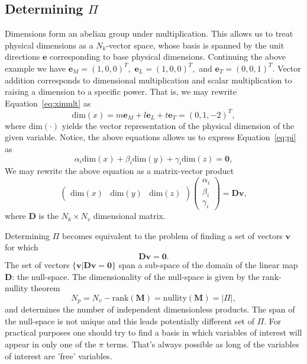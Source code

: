 \documentclass[11pt]{article}
\begin{document}
\subsection{Determining $\Pi$}
Dimensions form an abelian group under multiplication. This allows us to treat physical dimensions as a $N_k$-vector space, whose basis is spanned by the unit directions $\mathbf{e}$ corresponding to base physical dimensions. Continuing the above example we have $\mathbf{e}_M=(1,0,0)^T,$ $\mathbf{e}_L=(1,0,0)^T,$ and $\mathbf{e}_T=(0,0,1)^T$. Vector addition corresponds to dimensional multiplication and scalar multiplication to raising a dimension to a specific power. That is, we may rewrite Equation~\ref{eq:xinmlt} as 
\begin{equation}
    \text{dim}(x)= m\mathbf{e}_M + l\mathbf{e}_L + t\mathbf{e}_T = (0,1,-2)^T,
\end{equation}
where $\text{dim}(\cdot)$ yields the vector representation of the physical dimension of the given variable. Notice, the above equations allows us to express Equation~\ref{eq:pi} as
\begin{equation}
    \alpha_i\text{dim}(x) + \beta_i\text{dim}(y) + \gamma_i\text{dim}(z) = \mathbf{0},
\end{equation}
We may rewrite the above equation as a matrix-vector product
\begin{equation}
    \begin{pmatrix} \text{dim}(x) & \text{dim}(y) & \text{dim}(z)\end{pmatrix}\begin{pmatrix} \alpha_i \\ \beta_i \\ \gamma_i\end{pmatrix} = \mathbf{D}\mathbf{v},
\end{equation}
where $\mathbf{D}$ is the $N_k \times N_v$ dimensional matrix.

Determining $\Pi$ becomes equivalent to the problem of finding a set of vectors $\mathbf{v}$ for which
\begin{equation}
    \mathbf{D}\mathbf{v}=\mathbf{0}.
\end{equation}
The set of vectors $\{\mathbf{v}|\mathbf{D}\mathbf{v}=\mathbf{0}\}$ span a sub-space of the domain of the linear map $\mathbf{D}$: the null-space. The dimensionality of the null-space is given by the rank-nullity theorem
\begin{equation}
    N_p = N_v - \text{rank}(\mathbf{M}) = \text{nullity}(\mathbf{M}) = |\Pi|,
\end{equation}
and determines the number of independent dimensionless products. The span of the null-space is not unique and this leads potentially different set of $\Pi$. For practical purposes one should try to find a basis in which variables of interest will appear in only one of the $\pi$ terms. That's always possible as long of the variables of interest are 'free' variables. 
\end{document}
